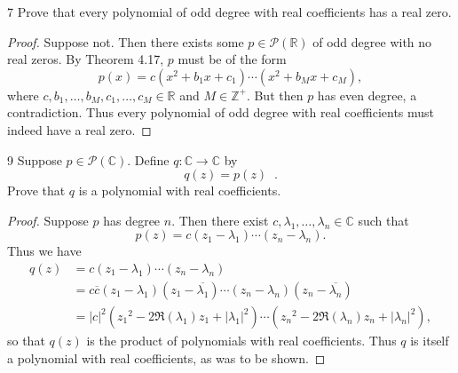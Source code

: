 \documentclass{extarticle}
\newenvironment{problem}[1]{\begin{prob*}{#1}{}}{\end{prob*}}
\newcommand{\Z}{\mathbb{Z}}
\newcommand{\R}{\mathbb{R}}
\newcommand{\C}{\mathbb{C}}
\newcommand{\poly}{\mathcal{P}}
\newcommand\widebar[1]{\mathop{\overline{#1}}}
\begin{document}
\begin{problem}{7}
Prove that every polynomial of odd degree with real coefficients has a real zero.
\end{problem}
\begin{proof}
Suppose not.  Then there exists some $p\in\poly(\R)$ of odd degree with no real zeros.  By Theorem 4.17, $p$ must be of the form
\begin{equation*}
p(x) = c(x^2 + b_1x + c_1)\cdots(x^2 + b_Mx + c_M),
\end{equation*}
where $c,b_1,\dots,b_M,c_1,\dots,c_M\in\R$ and $M\in\Z^+$.  But then $p$ has even degree, a contradiction.  Thus every polynomial of odd degree with real coefficients must indeed have a real zero.
\end{proof}

\begin{problem}{9}
Suppose $p\in\poly(\C)$.  Define $q:\C\to\C$ by
\begin{equation*}
q(z) = p(z)\widebar{p(\overline{z})}.
\end{equation*}
Prove that $q$ is a polynomial with real coefficients.
\end{problem}
\begin{proof}
Suppose $p$ has degree $n$.  Then there exist $c,\lambda_1,\dots,\lambda_n\in\C$ such that 
\begin{equation*}
p(z) = c(z_1 - \lambda_1)\cdots(z_n-\lambda_n).
\end{equation*}
Thus we have
\begin{align*}
q(z) &= c(z_1 - \lambda_1)\cdots(z_n-\lambda_n)\widebar{c\left(\overline{z_1} - \lambda_1\right)\cdots\left(\overline{z_n}-\lambda_n\right)}\\
&= c\overline{c}(z_1 - \lambda_1)\left(z_1 - \overline{\lambda_1}\right)\cdots(z_n-\lambda_n)\left(z_n - \overline{\lambda_n}\right)\\
&= |c|^2\left({z_1}^2 -2\Re(\lambda_1)z_1 + |\lambda_1|^2\right)\cdots\left({z_n}^2 -2\Re(\lambda_n)z_n + |\lambda_n|^2\right),
\end{align*}
so that $q(z)$ is the product of polynomials with real coefficients.  Thus $q$ is itself a polynomial with real coefficients, as was to be shown.
\end{proof}
\end{document}

